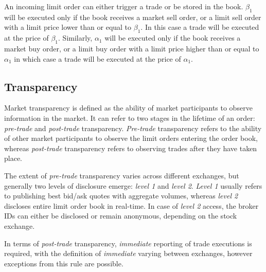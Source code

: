 An incoming limit order can either trigger a trade or be stored in the book.    $\beta_1$ will be executed only if the book receives a market sell order, or a limit sell order with a limit price lower than or equal to $\beta_1$. In this case a trade will be executed at the price of $\beta_1$. Similarly, $\alpha_1$ will be executed only if the book receives a market buy order, or a limit buy order with a limit price higher than or equal to $\alpha_1$ in which case a trade will be executed at the price of $\alpha_1$.

\subsection{Transparency}
Market transparency is defined as the ability of market participants to observe information in the market. It can refer to two stages in the lifetime of an order: \textit{pre-trade} and \textit{post-trade} transparency. \textit{Pre-trade} transparency refers to the ability of other market participants to observe the limit orders entering the order book, whereas \textit{post-trade} transparency refers to observing trades after they have taken place.

The extent of \textit{pre-trade} transparency varies across different exchanges, but generally two levels of disclosure emerge: \textit{level 1} and \textit{level 2}. \textit{Level 1} usually refers to publishing best bid/ask quotes  with aggregate volumes, whereas \textit{level 2} discloses entire limit order book in real-time. In case of \textit{level 2} access, the broker IDs can either be disclosed or remain anonymous, depending on the stock exchange.

In terms of \textit{post-trade} transparency, \textit{immediate} reporting of trade executions is required, with the definition of \textit{immediate} varying between exchanges, however exceptions from this rule are possible. 















